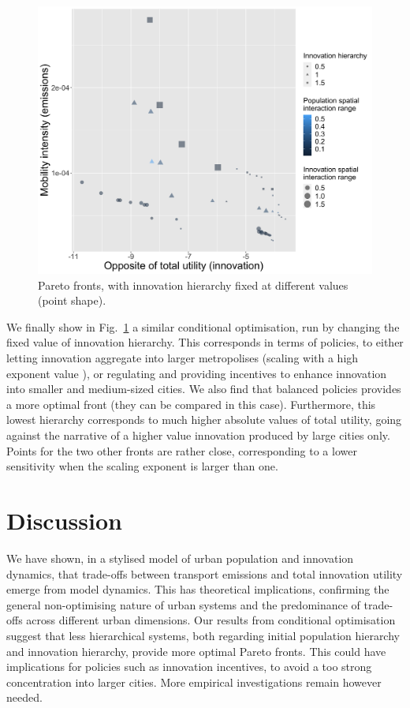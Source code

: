 \documentclass[final,5p,times,twocolumn,authoryear]{elsarticle}
\begin{document}
\begin{figure}
	\centering
	\includegraphics[width=\linewidth]{figures/Fig3.png}
	\caption{Pareto fronts, with innovation hierarchy fixed at different values (point shape).\label{fig:fig3}}
\end{figure}

We finally show in Fig.~\ref{fig:fig3} a similar conditional optimisation, run by changing the fixed value of innovation hierarchy. This corresponds in terms of policies, to either letting innovation aggregate into larger metropolises (scaling with a high exponent value \cite{pumain2006evolutionary}), or regulating and providing incentives to enhance innovation into smaller and medium-sized cities. We also find that balanced policies provides a more optimal front (they can be compared in this case). Furthermore, this lowest hierarchy corresponds to much higher absolute values of total utility, going against the narrative of a higher value innovation produced by large cities only. Points for the two other fronts are rather close, corresponding to a lower sensitivity when the scaling exponent is larger than one.




\section{Discussion}

We have shown, in a stylised model of urban population and innovation dynamics, that trade-offs between transport emissions and total innovation utility emerge from model dynamics. This has theoretical implications, confirming the general non-optimising nature of urban systems and the predominance of trade-offs across different urban dimensions. Our results from conditional optimisation suggest that less hierarchical systems, both regarding initial population hierarchy and innovation hierarchy, provide more optimal Pareto fronts. This could have implications for policies such as innovation incentives, to avoid a too strong concentration into larger cities. More empirical investigations remain however needed.
\end{document}
